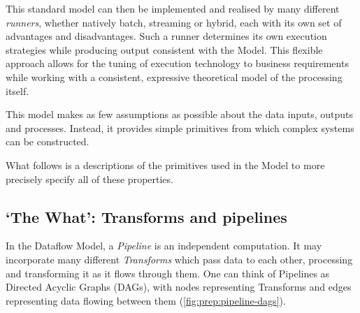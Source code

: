 This standard model can then be implemented and realised by many different \emph{runners}, whether natively batch, streaming or hybrid, each with its own set of advantages and disadvantages. 
Such a runner determines its own execution strategies while producing output consistent with the Model.
This flexible approach allows for the tuning of execution technology to business requirements while working with a consistent, expressive theoretical model of the processing itself.

This model makes as few assumptions as possible about the data inputs, outputs and processes. 
Instead, it provides simple primitives from which complex systems can be constructed.

What follows is a descriptions of the primitives used in the Model to more precisely specify all of these properties.

\subsection{`The What': Transforms and pipelines}\label{sec:prep:dataflow:what}

In the Dataflow Model, a \emph{Pipeline} is an independent computation.
It may incorporate many different \emph{Transforms} which pass data to each other, processing and transforming it as it flows through them.
One can think of Pipelines as Directed Acyclic Graphs (DAGs), with nodes representing Transforms and edges representing data flowing between them (\cref{fig:prep:pipeline-dags}).

